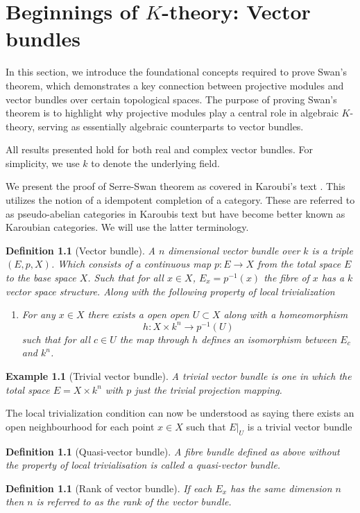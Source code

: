 \documentclass[12pt]{report}
\numberwithin{equation}{section}
\newtheorem{definition}[dummy]{Definition}
\newtheorem{example}[dummy]{Example}
\begin{document}
	\chapter{Beginnings of $K$-theory: Vector bundles}
	In this section, we introduce the foundational concepts required to prove Swan's theorem, which demonstrates a key connection between projective modules and vector bundles over certain topological spaces. The purpose of proving Swan's theorem is to highlight why projective modules play a central role in algebraic $K$-theory, serving as essentially algebraic counterparts to vector bundles.
	
	All results presented hold for both real and complex vector bundles. For simplicity, we use $k$ to denote the underlying field. 
	
	We present the proof of Serre-Swan theorem as covered in Karoubi's text \cite{karoubi2008k}. This utilizes the notion of a idempotent completion of a category. These are referred to as pseudo-abelian categories in Karoubis text but have become better known as Karoubian categories. We will use the latter terminology.
	
	\begin{definition}[Vector bundle]
		A $n$ dimensional vector bundle over $k$ is a triple $(E,p, X)$. Which consists of a continuous map $p:E \to X$ from the total space $E$ to the base space $X$. Such that for all $x \in X$, $E_x=p^{-1}(x)$ the fibre of $x$ has a $k$ vector space structure. Along with the following property of local trivialization
		\begin{enumerate}
			\item For any $x \in X$ there exists a open open $U \subset X$ along with a homeomorphism \[ h: X \times k^n	\to p^{-1}(U) \] such that for all $c \in U$ the map through $h$ defines an isomorphism between $E_c$ and $k^n$.
		\end{enumerate}
	\end{definition}
	\begin{example}[Trivial vector bundle]
		A trivial vector bundle is one in which the total space $E=X \times k^n$ with $p$ just the trivial projection mapping.
	\end{example}
	The local trivialization condition can now be understood as saying there exists an open neighbourhood for each point $x \in X$ such that $E|_U$ is a trivial vector bundle
	\begin{definition}[Quasi-vector bundle]
		A fibre bundle defined as above without the property of local trivialisation is called a quasi-vector bundle.
	\end{definition}
	\begin{definition}[Rank of vector bundle]
		If each $E_x$ has the same dimension $n$ then $n$ is referred to as the rank of the vector bundle.
	\end{definition}
	
\end{document}
